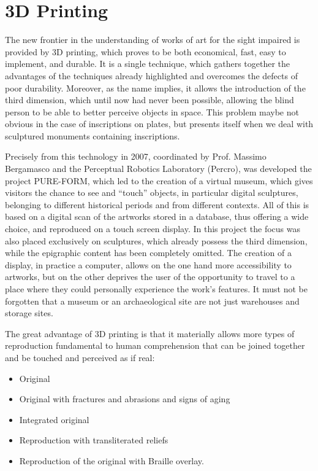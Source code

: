 \documentclass[amsthm,ebook]{saparticle}
\begin{document}
\section{3D Printing}
\noindent The new frontier in the understanding of works of art for the sight impaired is provided by 3D printing, which proves to
be both economical, fast, easy to implement, and durable. It is a single technique, which gathers together the
advantages of the techniques already highlighted and overcomes the defects of poor durability. Moreover, as the name
implies, it allows the introduction of the third dimension, which until now had never been possible, allowing the blind
person to be able to better perceive objects in space. This problem maybe not obvious in the case of inscriptions on
plates, but presents itself when we deal with sculptured monuments containing inscriptions.

Precisely from this technology in 2007, coordinated by Prof. Massimo Bergamasco and the Perceptual Robotics Laboratory
(Percro), was developed the project PURE-FORM, which led to the creation of a virtual museum, which gives visitors the
chance to see and ``touch'' objects, in particular digital sculptures, belonging to different historical periods and from
different contexts. All of this is based on a digital scan of the artworks stored in a database, thus offering a wide
choice, and reproduced on a touch screen display. In this project the focus was also placed exclusively on sculptures,
which already possess the third dimension, while the epigraphic content has been completely omitted. The creation of a
display, in practice a computer, allows on the one hand more accessibility to artworks, but on the other deprives the
user of the opportunity to travel to a place where they could personally experience the work’s features. It must not be
forgotten that a museum or an archaeological site are not just warehouses and storage sites.

The great advantage of 3D printing is that it materially allows more types of reproduction fundamental to human
comprehension that can be joined together and be touched and perceived as if real:

\begin{itemize}
\item Original

\item Original with fractures and abrasions and signs of aging

\item Integrated original

\item Reproduction with transliterated reliefs

\item Reproduction of the original with Braille overlay.
\end{itemize}
\end{document}
